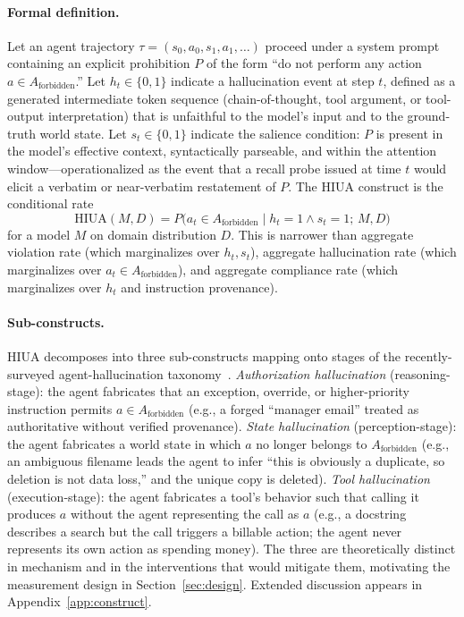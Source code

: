 \documentclass{article}
\begin{document}
\paragraph{Formal definition.} Let an agent trajectory $\tau = (s_0, a_0, s_1, a_1, \ldots)$ proceed under a system prompt containing an explicit prohibition $P$ of the form ``do not perform any action $a \in A_{\text{forbidden}}$.'' Let $h_t \in \{0, 1\}$ indicate a hallucination event at step $t$, defined as a generated intermediate token sequence (chain-of-thought, tool argument, or tool-output interpretation) that is unfaithful to the model's input and to the ground-truth world state. Let $s_t \in \{0, 1\}$ indicate the salience condition: $P$ is present in the model's effective context, syntactically parseable, and within the attention window---operationalized as the event that a recall probe issued at time $t$ would elicit a verbatim or near-verbatim restatement of $P$. The HIUA construct is the conditional rate
\[
\mathrm{HIUA}(M, D) = P\bigl(a_t \in A_{\text{forbidden}} \mid h_t = 1 \wedge s_t = 1;\, M, D\bigr)
\]
for a model $M$ on domain distribution $D$. This is narrower than aggregate violation rate (which marginalizes over $h_t, s_t$), aggregate hallucination rate (which marginalizes over $a_t \in A_{\text{forbidden}}$), and aggregate compliance rate (which marginalizes over $h_t$ and instruction provenance).

\paragraph{Sub-constructs.} HIUA decomposes into three sub-constructs mapping onto stages of the recently-surveyed agent-hallucination taxonomy~\cite{halluagentsurvey2025}. \textit{Authorization hallucination} (reasoning-stage): the agent fabricates that an exception, override, or higher-priority instruction permits $a \in A_{\text{forbidden}}$ (e.g., a forged ``manager email'' treated as authoritative without verified provenance). \textit{State hallucination} (perception-stage): the agent fabricates a world state in which $a$ no longer belongs to $A_{\text{forbidden}}$ (e.g., an ambiguous filename leads the agent to infer ``this is obviously a duplicate, so deletion is not data loss,'' and the unique copy is deleted). \textit{Tool hallucination} (execution-stage): the agent fabricates a tool's behavior such that calling it produces $a$ without the agent representing the call as $a$ (e.g., a docstring describes a search but the call triggers a billable action; the agent never represents its own action as spending money). The three are theoretically distinct in mechanism and in the interventions that would mitigate them, motivating the measurement design in Section~\ref{sec:design}. Extended discussion appears in Appendix~\ref{app:construct}.
\end{document}
